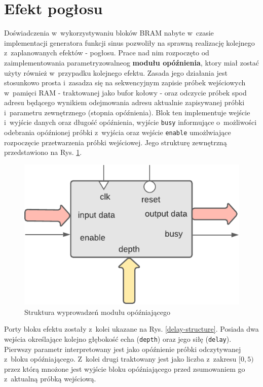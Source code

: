 \section{Efekt pogłosu}

Doświadczenia w~wykorzystywaniu bloków BRAM nabyte w~czasie implementacji generatora funkcji sinus pozwoliły na sprawną realizację kolejnego z~zaplanowanych efektów - pogłosu. Prace nad nim rozpoczęto od zaimplementowania parametryzowalneog \textbf{modułu opóźnienia}, ktory miał zostać użyty również w~przypadku kolejnego efektu. Zasada jego działania jest stosunkowo prosta i~zasadza się na sekwencyjnym zapisie próbek wejściowych w~pamięci RAM - traktowanej jako bufor kołowy - oraz odczycie próbek spod adresu będącego wynikiem odejmowania adresu aktualnie zapisywanej próbki i~parametru zewnętrznego (stopnia opóźnienia). Blok ten implementuje wejście i~wyjście danych oraz długość opóźnienia, wyjście \verb|busy| informujące o~możliwości odebrania opóźnionej próbki z~wyjścia oraz wejście \verb |enable| umożlwiające rozpoczęcie przetwarzenia próbki wejściowej. Jego strukturę zewnętrzną przedstawiono na Rys. \ref{delay-line-structure}.

\vspace{0.5cm}
\begin{figure}[ht]
    \centering
    \includegraphics[scale=0.75]{img/diagrams/delay_line.pdf}
    \captionsetup{format=plain,justification=centering}
    \caption{Struktura wyprowadzeń modułu opóźniającego}
    \label{delay-line-structure}
\end{figure}
\vspace{0.5cm}

Porty bloku efektu zostały z~kolei ukazane na Rys. \ref{delay-structure}. Posiada dwa wejścia określające kolejno głębokość echa (\verb|depth|) oraz jego siłę (\verb|delay|). Pierwszy parametr interpretowany jest jako opóźnienie próbki odczytywanej z~bloku opóźniającego. Z~kolei drugi traktowany jest jako liczba z~zakresu $[0,5)$ przez którą mnożone jest wyjście bloku opóźniającego przed zsumowaniem go z~aktualną próbką wejściową.

